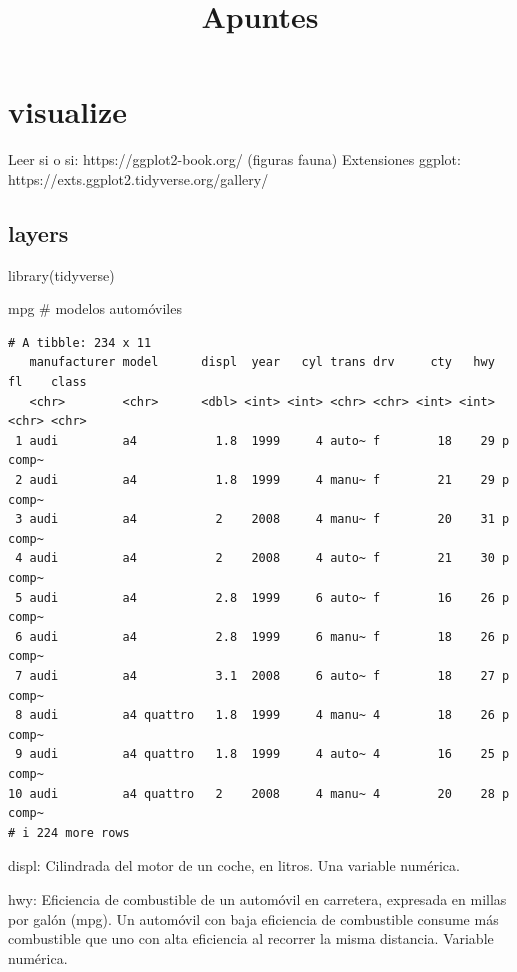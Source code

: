 \documentclass[
  letterpaper,
  DIV=11,
  numbers=noendperiod]{scrartcl}
\title{Apuntes}
\author{}
\date{}
\newenvironment{Shaded}{\begin{snugshade}}{\end{snugshade}}
\newcommand{\CommentTok}[1]{\textcolor[rgb]{0.37,0.37,0.37}{#1}}
\newcommand{\FunctionTok}[1]{\textcolor[rgb]{0.28,0.35,0.67}{#1}}
\newcommand{\NormalTok}[1]{\textcolor[rgb]{0.00,0.23,0.31}{#1}}
\begin{document}
\maketitle


\section{visualize}\label{visualize}

Leer si o si: https://ggplot2-book.org/ (figuras fauna) Extensiones
ggplot: https://exts.ggplot2.tidyverse.org/gallery/

\subsection{layers}\label{layers}

\begin{Shaded}
\begin{Highlighting}[]
\FunctionTok{library}\NormalTok{(tidyverse)}

\NormalTok{mpg }\CommentTok{\# modelos automóviles}
\end{Highlighting}
\end{Shaded}

\begin{verbatim}
# A tibble: 234 x 11
   manufacturer model      displ  year   cyl trans drv     cty   hwy fl    class
   <chr>        <chr>      <dbl> <int> <int> <chr> <chr> <int> <int> <chr> <chr>
 1 audi         a4           1.8  1999     4 auto~ f        18    29 p     comp~
 2 audi         a4           1.8  1999     4 manu~ f        21    29 p     comp~
 3 audi         a4           2    2008     4 manu~ f        20    31 p     comp~
 4 audi         a4           2    2008     4 auto~ f        21    30 p     comp~
 5 audi         a4           2.8  1999     6 auto~ f        16    26 p     comp~
 6 audi         a4           2.8  1999     6 manu~ f        18    26 p     comp~
 7 audi         a4           3.1  2008     6 auto~ f        18    27 p     comp~
 8 audi         a4 quattro   1.8  1999     4 manu~ 4        18    26 p     comp~
 9 audi         a4 quattro   1.8  1999     4 auto~ 4        16    25 p     comp~
10 audi         a4 quattro   2    2008     4 manu~ 4        20    28 p     comp~
# i 224 more rows
\end{verbatim}

displ: Cilindrada del motor de un coche, en litros. Una variable
numérica.

hwy: Eficiencia de combustible de un automóvil en carretera, expresada
en millas por galón (mpg). Un automóvil con baja eficiencia de
combustible consume más combustible que uno con alta eficiencia al
recorrer la misma distancia. Variable numérica.
\end{document}
